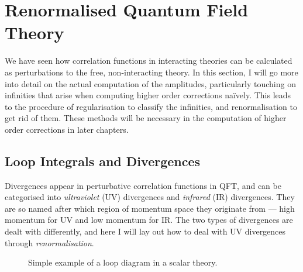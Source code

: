 \documentclass[../main.tex]{subfiles}
\begin{document}
\section{Renormalised Quantum Field Theory}
\label{qft:sec:renormalisation}
We have seen how correlation functions in interacting theories can be calculated as perturbations to the free, non-interacting theory.
In this section, I will go more into detail on the actual computation of the amplitudes, particularly touching on infinities that arise when computing higher order corrections naïvely.
This leads to the procedure of regularisation to classify the infinities, and renormalisation to get rid of them.
These methods will be necessary in the computation of higher order corrections in later chapters.


\subsection{Loop Integrals and Divergences}
Divergences appear in perturbative correlation functions in QFT, and can be
categorised into \emph{ultraviolet} (UV) divergences and \emph{infrared} (IR)
divergences. They are so named after which region of momentum space they
originate from --- high momentum for UV and low momentum for IR\@. The two types
of divergences are dealt with differently, and here I will lay out how
to deal with UV divergences through \emph{renormalisation}.
\medskip
\begin{figure}[!ht]
  \centering
  \caption{Simple example of a loop diagram in a scalar theory.}
  \label{qft:fig:example_loop}
\end{figure}
\end{document}
